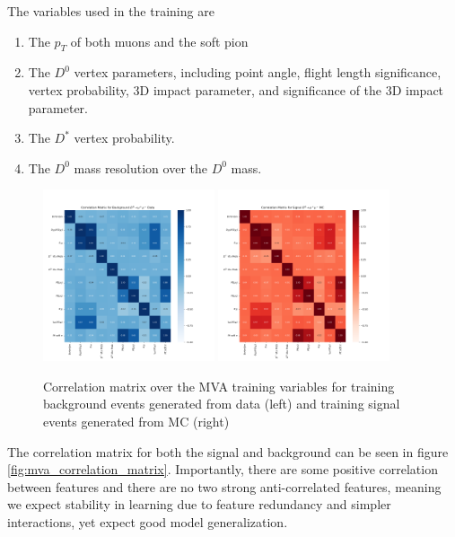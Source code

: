 The variables used in the training are
\begin{enumerate}
    \item The $p_T$ of both muons and the soft pion
    \item The $D^0$ vertex parameters, including point angle, flight length significance, vertex probability, 3D impact parameter, and significance of the 3D impact parameter.
    \item The $D^*$ vertex probability.
    \item The $D^0$ mass resolution over the $D^0$ mass.
\end{enumerate}

\begin{figure}[htp]
    \begin{center}
      \includegraphics[width=0.45\textwidth]{figures/chapter4/mva/Correlation_data.png}
      \includegraphics[width=0.45\textwidth]{figures/chapter4/mva/Correlation_dmm.png}\\
    \end{center}
    \caption{
      Correlation matrix over the MVA training variables for training background events generated from data (left) and training signal events generated from MC (right)
    }
    \label{fig:mva_correlation_matrix_for_training_variables}
\end{figure}

The correlation matrix for both the signal and background can be seen in figure \ref{fig:mva_correlation_matrix}. Importantly, there are some positive correlation between features and there are no two strong anti-correlated features, meaning we expect stability in learning due to feature redundancy and simpler interactions, yet expect good model generalization. 

